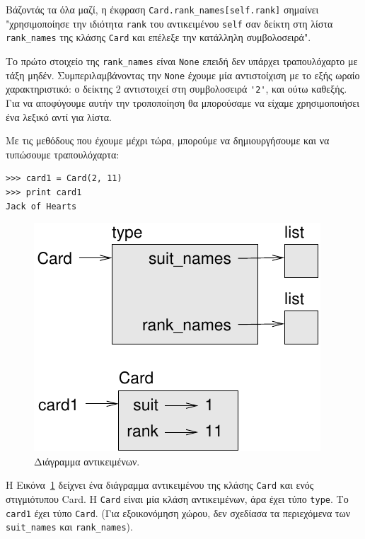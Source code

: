 \documentclass[10pt]{book}
\begin{document}
Βάζοντάς τα όλα μαζί, η έκφραση \verb"Card.rank_names[self.rank]" σημαίνει  
"χρησιμοποίησε την ιδιότητα {\tt rank} του αντικειμένου {\tt self}
σαν δείκτη στη λίστα \verb"rank_names" της κλάσης {\tt Card} και επέλεξε 
την κατάλληλη συμβολοσειρά".

Το πρώτο στοιχείο της \verb"rank_names" είναι {\tt None} επειδή δεν
υπάρχει τραπουλόχαρτο με τάξη μηδέν. Συμπεριλαμβάνοντας την {\tt None} έχουμε
μία αντιστοίχιση με το εξής ωραίο χαρακτηριστικό: ο δείκτης 2 αντιστοιχεί στη 
συμβολοσειρά \verb"'2'", και ούτω καθεξής. Για να αποφύγουμε αυτήν την τροποποίηση
θα μπορούσαμε να είχαμε χρησιμοποιήσει ένα λεξικό αντί για λίστα.

Με τις μεθόδους που έχουμε μέχρι τώρα, μπορούμε να δημιουργήσουμε και να τυπώσουμε 
τραπουλόχαρτα:

\begin{verbatim}
>>> card1 = Card(2, 11)
>>> print card1
Jack of Hearts
\end{verbatim}

\begin{figure}
\centerline
{\includegraphics[scale=0.8]{figs/card1.pdf}}
 \caption{Διάγραμμα αντικειμένων.} 
\label{fig.card1}
\end{figure}

Η Εικόνα~\ref{fig.card1} δείχνει ένα διάγραμμα αντικειμένου της κλάσης
{\tt Card} και ενός στιγμιότυπου Card.
Η {\tt Card} είναι μία κλάση αντικειμένων, άρα έχει τύπο {\tt type}.
Το {\tt card1} έχει τύπο {\tt Card}. (Για εξοικονόμηση χώρου, δεν
σχεδίασα τα περιεχόμενα των \verb"suit_names" και \verb"rank_names").
\end{document}
